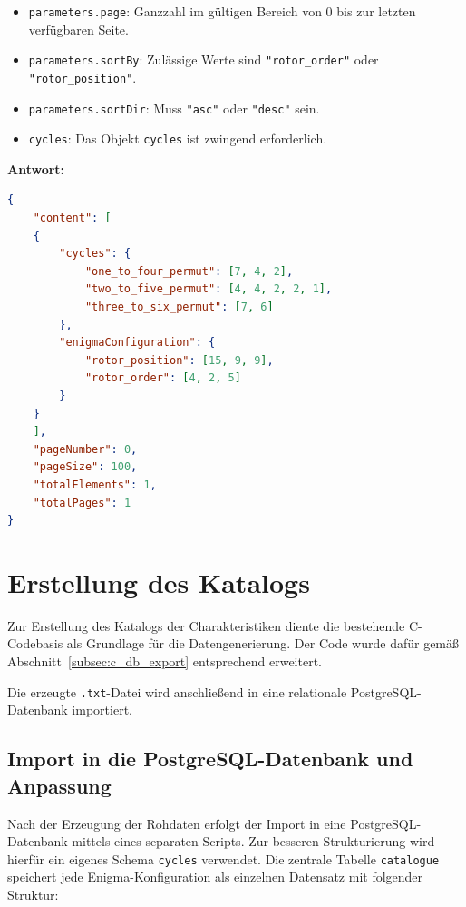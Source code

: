 \documentclass[12pt, ngerman, a4paper, numbers=noenddot]{article}
\begin{document}
\begin{itemize}
	\item \lstinline|parameters.page|: Ganzzahl im gültigen Bereich von 0 bis zur letzten verfügbaren Seite.
	\item \lstinline|parameters.sortBy|: Zulässige Werte sind \lstinline|"rotor_order"| oder \newline\lstinline|"rotor_position"|.
	\item \lstinline|parameters.sortDir|: Muss \lstinline|"asc"| oder \lstinline|"desc"| sein.
	\item \lstinline|cycles|: Das Objekt \lstinline|cycles| ist zwingend erforderlich.
\end{itemize}
\newpage
\textbf{Antwort:}
\begin{lstlisting}[language=json, caption={Antwort auf /catalogue-Anfrage}]
{
	"content": [
	{
		"cycles": {
			"one_to_four_permut": [7, 4, 2],
			"two_to_five_permut": [4, 4, 2, 2, 1],
			"three_to_six_permut": [7, 6]
		},
		"enigmaConfiguration": {
			"rotor_position": [15, 9, 9],
			"rotor_order": [4, 2, 5]
		}
	}
	],
	"pageNumber": 0,
	"pageSize": 100,
	"totalElements": 1,
	"totalPages": 1
}
\end{lstlisting}







\section{Erstellung des Katalogs}
\label{sec:db_erstellung}

Zur Erstellung des Katalogs der Charakteristiken diente die bestehende C-Codebasis als Grundlage für die Datengenerierung. Der Code wurde dafür gemäß Abschnitt~\ref{subsec:c_db_export} entsprechend erweitert.
  
Die erzeugte \lstinline|.txt|-Datei wird anschließend in eine relationale PostgreSQL-Datenbank importiert.




\subsection{Import in die PostgreSQL-Datenbank und Anpassung}

Nach der Erzeugung der Rohdaten erfolgt der Import in eine PostgreSQL-Datenbank mittels eines separaten Scripts. Zur besseren Strukturierung wird hierfür ein eigenes Schema \lstinline|cycles| verwendet.  
Die zentrale Tabelle \lstinline|catalogue| speichert jede Enigma-Konfiguration als einzelnen Datensatz mit folgender Struktur:
\end{document}

